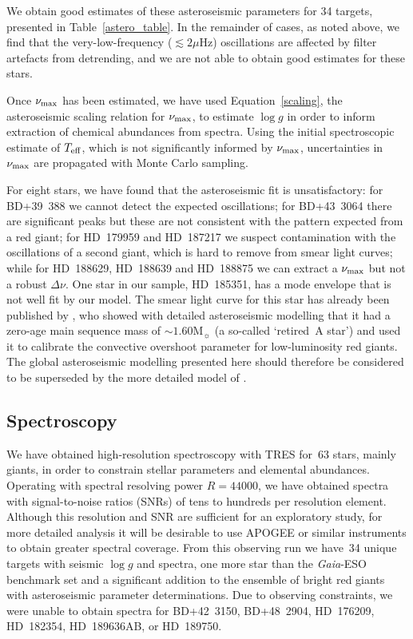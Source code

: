 \documentclass[a4paper,fleqn,usenatbib]{mnras}
\newcommand{\numax}{\mbox{$\nu_{\rm max}$}\xspace}
\newcommand{\Dnu}{\mbox{$\Delta \nu$}\xspace}
\newcommand{\muHz}{\mbox{$\mu$Hz}\xspace}
\newcommand{\teff}{\mbox{$T_{\rm eff}$}\xspace}
\newcommand{\logg}{\mbox{$\log g$}\xspace}
\newcommand{\msun}{\mbox{$\mathrm{M}_{\sun}$}\xspace}
\newcommand{\gaia}{\emph{Gaia}\xspace}
\begin{document}
We obtain good estimates of these asteroseismic parameters for 34 targets, presented in Table~\ref{astero_table}. In the remainder of cases, as noted above, we find that the very-low-frequency ($\lesssim 2\muHz$) oscillations are affected by filter artefacts from detrending, and we are not able to obtain good estimates for these stars. 

Once \numax has been estimated, we have used Equation~\ref{scaling}, the asteroseismic scaling relation for \numax \citep{1991ApJ...368..599B,KB95}, to estimate \logg in order to inform extraction of chemical abundances from spectra. Using the initial spectroscopic estimate of \teff, which is not significantly informed by \numax, uncertainties in \numax are propagated with Monte Carlo sampling. 

For eight stars, we have found that the asteroseismic fit is unsatisfactory: for BD+39~388 we cannot detect the expected oscillations; for BD+43~3064 there are significant peaks but these are not consistent with the pattern expected from a red giant; for HD~179959 and HD~187217 we suspect contamination with the oscillations of a second giant, which is hard to remove from smear light curves; while for HD~188629, HD~188639 and HD~188875 we can extract a \numax but not a robust \Dnu. One star in our sample, HD~185351, has a mode envelope that is not well fit by our model. The smear light curve for this star has already been published by \citet{2017MNRAS.464.3713H}, who showed with detailed asteroseismic modelling that it had a zero-age main sequence mass of $\sim 1.60 \msun$ (a so-called `retired~A star') and used it to calibrate the convective overshoot parameter for low-luminosity red giants. The global asteroseismic modelling presented here should therefore be considered to be superseded by the more detailed model of \citet{2017MNRAS.464.3713H}. 



\subsection{Spectroscopy}
\label{spectroscopy}

We have obtained high-resolution spectroscopy with TRES for~63 stars, mainly giants, in order to constrain stellar parameters and elemental abundances. Operating with spectral resolving power $R=44 000$, we have obtained spectra with signal-to-noise ratios (SNRs) of tens to hundreds per resolution element. Although this resolution and SNR are sufficient for an exploratory study, for more detailed analysis it will be desirable to use APOGEE or similar instruments to obtain greater spectral coverage. From this observing run we have~34 unique targets with seismic \logg and spectra, one more star than the \gaia-ESO benchmark set and a significant addition to the ensemble of bright red giants with asteroseismic parameter determinations. Due to observing constraints, we were unable to obtain spectra for BD+42~3150, BD+48~2904, HD~176209, HD~182354, HD~189636AB, or HD~189750. %
\end{document}
